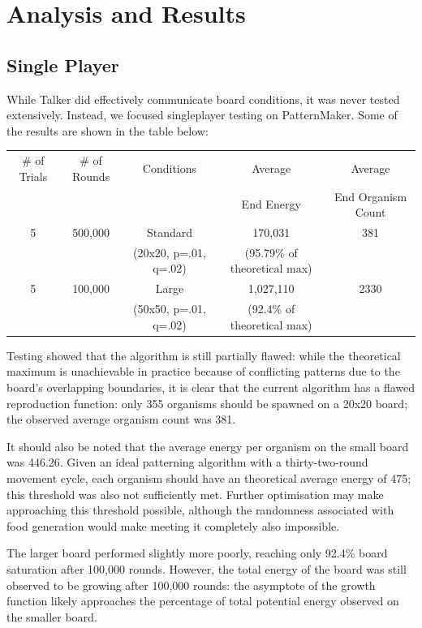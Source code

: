 \section{Analysis and Results}
\label{sec:analysis}
\subsection{Single Player}
While Talker did effectively communicate board conditions, it was never tested extensively.  Instead, we focused singleplayer testing on PatternMaker.  Some of the results are shown in the table below:

\begin{table}[h]
\centering
\begin{tabular}{|c|c|c|c|c|}
\hline
\# of Trials & \# of Rounds & Conditions & Average  & Average \\
             &              &            & End Energy & End Organism Count\\
\hline
5            & 500,000      & Standard  &  170,031   & 381\\
             &              & (20x20, p=.01, q=.02)  &  (95.79\% of theoretical max) & \\
\hline
5 & 100,000 & Large  & 1,027,110  & 2330\\
             &              & (50x50, p=.01, q=.02) &  (92.4\% of theoretical max) & \\
\hline
\end{tabular}
\end{table}
Testing showed that the algorithm is still partially flawed: while the
theoretical maximum is unachievable in practice because of conflicting
patterns due to the board’s overlapping boundaries, it is clear that
the current algorithm has a flawed reproduction function: only 355
organisms should be spawned on a 20x20 board; the observed average
organism count was 381.

It should also be noted that the average energy per organism on the
small board was 446.26.  Given an ideal patterning algorithm with a
thirty-two-round movement cycle, each organism should have an
theoretical average energy of 475; this threshold was also not
sufficiently met.  Further optimisation may make approaching this
threshold possible, although the randomness associated with food
generation would make meeting it completely also impossible.

The larger board performed slightly more poorly, reaching only 92.4\%
board saturation after 100,000 rounds.  However, the total energy of
the board was still observed to be growing after 100,000 rounds: the
asymptote of the growth function likely approaches the percentage of
total potential energy observed on the smaller board.




